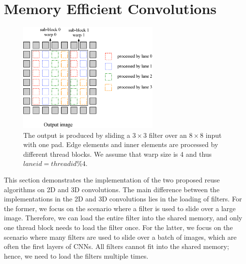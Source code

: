 \section{Memory Efficient Convolutions}
\begin{figure}
	\centering
	\includegraphics[width=0.9\columnwidth,height=5.5cm]{./figure/overalldesign.eps}
\caption{The output is produced by sliding a $3 \times 3$ filter over an $8 \times 8$ input with one pad. Edge elements and inner elements are processed by different {\color{red}thread blocks}. We assume that {\color{red}warp size} is 4 and thus $laneid=threadid\%4$.}
\label{fig:overalldesign}
\end{figure}


This section demonstrates the implementation of the two proposed reuse algorithms on 2D and 3D convolutions. The main difference between the 
implementations in the 2D and 3D convolutions lies in the loading of filters. For the former, we focus on the scenario where a filter is used to
slide over a large image. Therefore, we can load the entire filter into the shared memory, and only one thread block needs to load the
filter once. For the latter, we focus on the scenario where many filters are used to slide over a batch of images, which are often the
first layers of CNNs. All filters cannot fit into the shared memory; hence, we need to load the filters multiple times.

